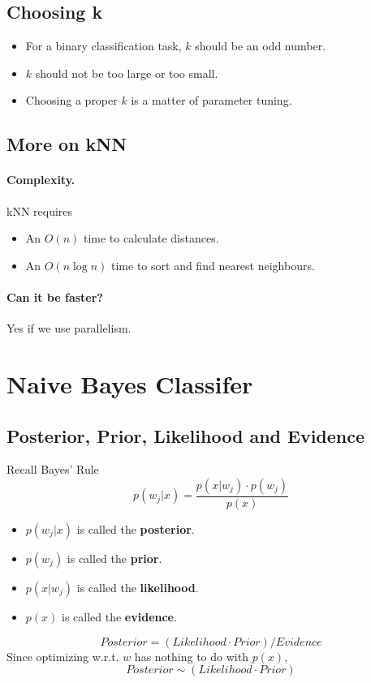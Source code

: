     \subsection{Choosing k}
        \begin{itemize}
            \item For a binary classification task, $k$ should be an odd number.
            \item $k$ should not be too large or too small.
            \item Choosing a proper $k$ is a matter of parameter tuning.
        \end{itemize}

    \subsection{More on kNN}
        \paragraph{Complexity.}
        kNN requires
        \begin{itemize}
            \item An $O(n)$ time to calculate distances.
            \item An $O(n\log n)$ time to sort and find nearest neighbours.
        \end{itemize}
        \paragraph{Can it be faster?}
        Yes if we use parallelism.


\section{Naive Bayes Classifer}

    \subsection{Posterior, Prior, Likelihood and Evidence}
        Recall Bayes' Rule
        \[ p(w_j|x) = \frac{p(x|w_j) \cdot p(w_j)}{p(x)} \]
        \begin{itemize}
            \item $p(w_j|x)$ is called the \textbf{posterior}.
            \item $p(w_j)$ is called the \textbf{prior}.
            \item $p(x|w_j)$ is called the \textbf{likelihood}.
            \item $p(x)$ is called the \textbf{evidence}.
        \end{itemize}
        \[ Posterior = (Likelihood \cdot Prior) / Evidence \]
        Since optimizing w.r.t. $w$ has nothing to do with $p(x)$,
        \[ Posterior \sim (Likelihood \cdot Prior) \]

